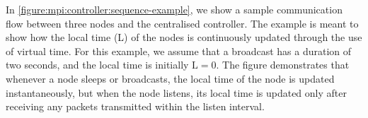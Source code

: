 In \autoref{figure:mpi:controller:sequence-example}, we show a sample communication flow between three nodes and the centralised controller. The example is meant to show how the local time (L) of the nodes is continuously updated through the use of virtual time. For this example, we assume that a broadcast has a duration of two seconds, and the local time is initially $\text{L} = 0$. The figure demonstrates that whenever a node sleeps or broadcasts, the local time of the node is updated instantaneously, but when the node listens, its local time is updated only after receiving any packets transmitted within the listen interval. 














